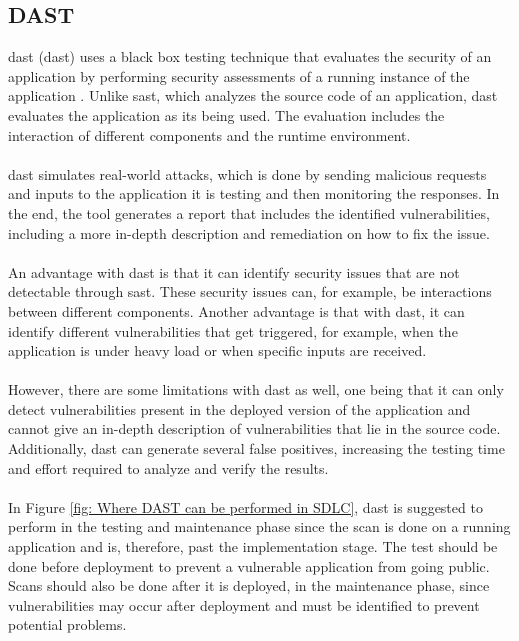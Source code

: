 \subsection{DAST}
\acrlong{dast} (\acrshort{dast}) uses a black box testing technique that evaluates the security of an application by performing security assessments of a running instance of the application \cite{dast}. Unlike \acrshort{sast}, which analyzes the source code of an application, \acrshort{dast} evaluates the application as its being used. The evaluation includes the interaction of different components and the runtime environment. 
\\~\\
\acrshort{dast} simulates real-world attacks, which is done by sending malicious requests and inputs to the application it is testing and then monitoring the responses. In the end, the tool generates a report that includes the identified vulnerabilities, including a more in-depth description and remediation on how to fix the issue. 
\\~\\
An advantage with \acrshort{dast} is that it can identify security issues that are not detectable through \acrshort{sast}. These security issues can, for example, be interactions between different components. Another advantage is that with \acrshort{dast}, it can identify different vulnerabilities that get triggered, for example, when the application is under heavy load or when specific inputs are received.
\\~\\
However, there are some limitations with \acrshort{dast} as well, one being that it can only detect vulnerabilities present in the deployed version of the application and cannot give an in-depth description of vulnerabilities that lie in the source code. Additionally, \acrshort{dast} can generate several false positives, increasing the testing time and effort required to analyze and verify the results. 
\\~\\
In Figure \ref{fig: Where DAST can be performed in SDLC}, \acrshort{dast} is suggested to perform in the testing and maintenance phase since the scan is done on a running application and is, therefore, past the implementation stage. The test should be done before deployment to prevent a vulnerable application from going public. Scans should also be done after it is deployed, in the maintenance phase, since vulnerabilities may occur after deployment and must be identified to prevent potential problems. 


